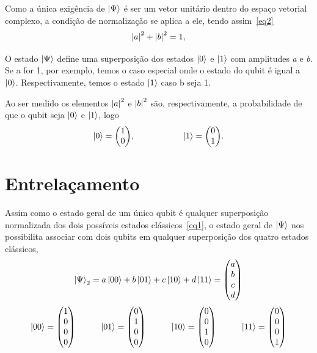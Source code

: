 \documentclass[a4paper, 12pt, oneside]{book}
\begin{document}
Como a única exigência de $\ket{\Psi}$ é ser um vetor unitário dentro do espaço vetorial complexo, a condição de normalização se aplica a ele, tendo assim~\eqref{eq2}~\cite{mermin}
\begin{equation}\label{eq2}
\abs{a}^2 + \abs{b}^2 = 1,
\end{equation}

O estado $\ket{\Psi}$ define uma superposição dos estados $\ket{0}$ e $\ket{1}$ com amplitudes \textit{a} e \textit{b}. Se a for 1, por exemplo, temos o caso especial onde o estado do qubit é igual a $\ket{0}$. Respectivamente, temos o estado $\ket{1}$ caso b seja 1.

Ao ser medido os elementos $\abs{a}^2$ e $\abs{b}^2$ são, respectivamente, a probabilidade de que o qubit seja $\ket{0}$ e $\ket{1}$, logo 
\begin{align*} 
  \ket{0} = \mqty(1\\0) ,\hspace{2cm} 
  \ket{1} = \mqty(0\\1).
\end{align*}


\section{Entrelaçamento}
Assim como o estado geral de um único qubit é qualquer superposição normalizada dos dois possíveis estados clássicos~\eqref{eq1}, o estado geral de $\ket{\Psi}$ nos possibilita associar com dois qubits em qualquer superposição dos quatro estados clássicos,
\begin{equation}\label{eq3}
\ket{\Psi}_2 = a\ket{00} + b\ket{01} + c\ket{10} + d\ket{11} = \mqty(a\\b\\c\\d)
\end{equation}
\begin{align*}
  \ket{00} = \mqty(1\\0\\0\\0) \hspace{1cm} 
  \ket{01} = \mqty(0\\1\\0\\0) \hspace{1cm} 
  \ket{10} = \mqty(0\\0\\1\\0) \hspace{1cm} 
  \ket{11} = \mqty(0\\0\\0\\1)
\end{align*}
\end{document}
